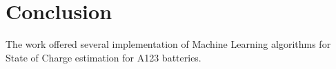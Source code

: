 \section{Conclusion}\label{sec:conclussion}
The work offered several implementation of Machine Learning algorithms for State of Charge estimation for A123 batteries.